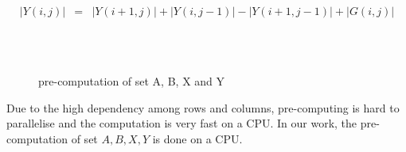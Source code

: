 \documentclass[AMA,LATO1COL]{WileyNJD-v2}
\begin{document}
\begin{eqnarray}
|Y(i,j)|  &= & |Y(i+1,j)| + |Y(i,j-1)| - |Y(i+1,j-1)| + |G(i,j)|
\end{eqnarray}
\normalsize

\begin{figure}[h]
\centering
{}
~~\\
~~
~~
\caption{pre-computation of set A, B, X and Y}\label{prec}
\end{figure}

Due to the high dependency among rows and columns, pre-computing is hard to parallelise and the computation is very fast on a CPU. In our work, the pre-computation of set $A, B, X, Y$ is done on a CPU.
\end{document}
